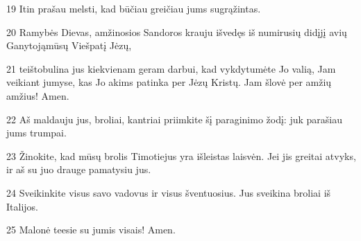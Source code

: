 \par 19 Itin prašau melsti, kad būčiau greičiau jums sugrąžintas. 
\par 20 Ramybės Dievas, amžinosios Sandoros krauju išvedęs iš numirusių didįjį avių Ganytoją­mūsų Viešpatį Jėzų, 
\par 21 teištobulina jus kiekvienam geram darbui, kad vykdytumėte Jo valią, Jam veikiant jumyse, kas Jo akims patinka per Jėzų Kristų. Jam šlovė per amžių amžius! Amen. 
\par 22 Aš maldauju jus, broliai, kantriai priimkite šį paraginimo žodį: juk parašiau jums trumpai. 
\par 23 Žinokite, kad mūsų brolis Timotiejus yra išleistas laisvėn. Jei jis greitai atvyks, ir aš su juo drauge pamatysiu jus. 
\par 24 Sveikinkite visus savo vadovus ir visus šventuosius. Jus sveikina broliai iš Italijos. 
\par 25 Malonė teesie su jumis visais! Amen.



